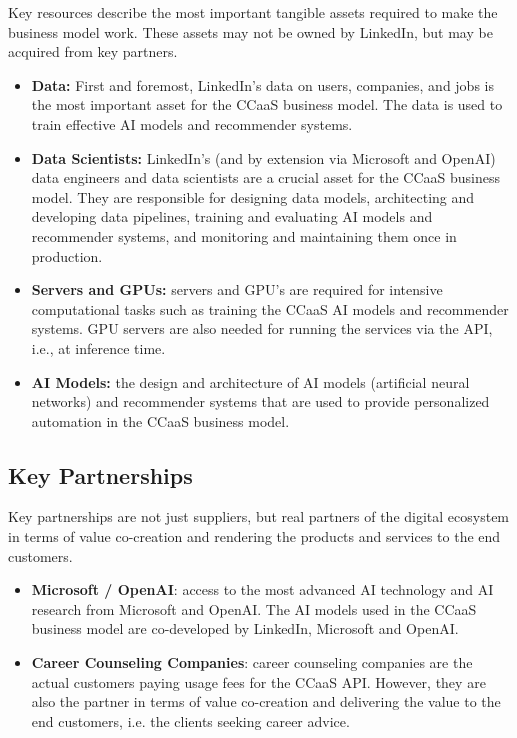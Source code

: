 Key resources describe the most important tangible assets required to make the business model work. These
assets may not be owned by LinkedIn, but may be acquired from key partners.

\begin{itemize}
        \item \textbf{Data:} First and foremost, LinkedIn's data on users, companies, and jobs is the most
                important asset for the CCaaS business model. The data is used to train effective AI models
                and recommender systems.
        \item \textbf{Data Scientists:} LinkedIn's (and by extension via Microsoft and OpenAI) data engineers 
                and data scientists are a crucial asset for the CCaaS business model. They are responsible for
                designing data models, architecting and developing data pipelines, training and evaluating
                AI models and recommender systems, and monitoring and maintaining them once in production.
        \item \textbf{Servers and GPUs:} servers and GPU's are required for intensive computational tasks 
                such as training the CCaaS AI models and recommender systems. GPU servers are also needed 
                for running the services via the API, i.e., at inference time.
        \item \textbf{AI Models:} the design and architecture of AI models (artificial neural networks) and
                recommender systems that are used to provide personalized automation in the CCaaS business model.
\end{itemize}

\subsection{Key Partnerships}

Key partnerships are not just suppliers, but real partners of the digital ecosystem in terms of value
co-creation and rendering the products and services to the end customers.

\begin{itemize}
    \item \textbf{Microsoft / OpenAI}: access to the most advanced AI technology and AI research
        from Microsoft and OpenAI. The AI models used in the CCaaS business model are co-developed
        by LinkedIn, Microsoft and OpenAI.
    \item \textbf{Career Counseling Companies}: career counseling companies are the actual customers
        paying usage fees for the CCaaS API. However, they are also the partner in terms of value 
        co-creation and delivering the value to the end customers, i.e. the clients seeking career
        advice. 
\end{itemize}

